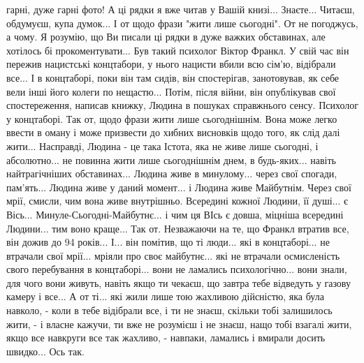 гарні, дуже гарні фото! А ці рядки я вже читав у Вашій книзі... Знаєте...
Читаєш, обдумуєш, купа думок... І от щодо фрази "жити лише сьогодні". От не
погоджусь, а чому. Я розумію, що Ви писали ці рядки в дуже важких обставинах,
але хотілось бі прокоментувати... Був такий психолог Віктор Франкл. У свій час
він пережив нацистські концтабори, у нього нацисти вбили всю сім'ю, відібрали
все... І в концтаборі, поки він там сидів, він спостерігав, занотовував, як
себе вели інші його колеги по нещастю... Потім, після війни, він опублікував
свої спостереження, написав книжку, Людина в пошуках справжнього сенсу.
Психолог у концтаборі. Так от, щодо фрази жити лише сьогоднішнім. Вона може
легко ввести в оману і може призвести до хибних висновків щодо того, як слід
далі жити... Насправді, Людина - це така Істота, яка не живе лише сьогодні, і
абсолютно... не повинна жити лише сьогоднішнім днем, в будь-яких... навіть
найтрагічніших обставинах... Людина живе в минулому... через свої спогади,
пам'ять... Людина живе у даний момент... і Людина живе Майбутнім. Через свої
мрії, смисли, чим вона живе внутрішньо. Всередині кожної Людини, її душі... є
Вісь... Минуле-Сьогодні-Майбутнє... і чим ця ВІсь є довша, міцніша всередині
Людини... тим воно краще... Так от. Незважаючи на те, що Франкл втратив все,
він дожив до 94 років... І... він помітив, що ті люди... які в концтаборі... не
втрачали свої мрії... мріяли про своє майбутнє... які не втрачали осмисленість
свого перебування в концтаборі... вони не ламались психологічно... вони знали,
для чого вони живуть, навіть якщо ти чекаєш, що завтра тебе відведуть у газову
камеру і все... А от ті... які жили лише тою жахливою дійсністю, яка була
навколо, - коли в тебе відібрали все, і ти не знаєш, скільки тобі залишилось
жити, - і власне кажучи, ти вже не розумієш і не знаєш, нащо тобі взагалі жити,
якщо все навкруги все так жахливо, - навпаки, ламались і вмирали досить
швидко... Ось так.


